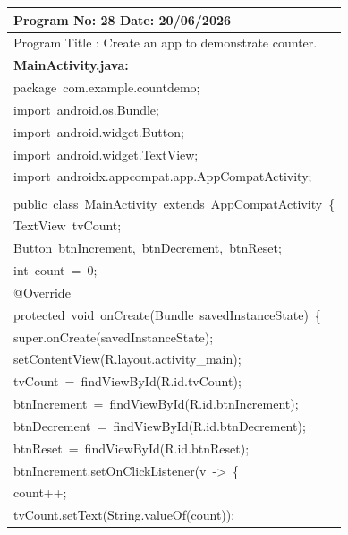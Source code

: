\documentclass[a4paper,12pt]{article}
\begin{document}
\noindent\begingroup
\renewcommand{\arraystretch}{1.1}
\begin{longtable}{|p{}|}
\hline\endfirsthead\hline\endhead\hline\endfoot\hline\endlastfoot
\rule{0pt}{13pt}Program No: 28 \hfill Date: 20/06/2026 \\
\hline
\rule{0pt}{13pt}Program Title : Create an app to demonstrate counter. \\
\hline
\rule{0pt}{13pt}\textbf{MainActivity.java:} \\
\hline
{\ttfamily\small package\ com.example.countdemo;} \\
{\ttfamily\small import\ android.os.Bundle;} \\
{\ttfamily\small import\ android.widget.Button;} \\
{\ttfamily\small import\ android.widget.TextView;} \\
{\ttfamily\small import\ androidx.appcompat.app.AppCompatActivity;} \\
\strut \\
{\ttfamily\small public\ class\ MainActivity\ extends\ AppCompatActivity\ \{} \\
{\ttfamily\small TextView\ tvCount;} \\
{\ttfamily\small Button\ btnIncrement,\ btnDecrement,\ btnReset;} \\
{\ttfamily\small int\ count\ =\ 0;} \\
{\ttfamily\small @Override} \\
{\ttfamily\small protected\ void\ onCreate(Bundle\ savedInstanceState)\ \{} \\
{\ttfamily\small super.onCreate(savedInstanceState);} \\
{\ttfamily\small setContentView(R.layout.activity\_main);} \\
{\ttfamily\small tvCount\ =\ findViewById(R.id.tvCount);} \\
{\ttfamily\small btnIncrement\ =\ findViewById(R.id.btnIncrement);} \\
{\ttfamily\small btnDecrement\ =\ findViewById(R.id.btnDecrement);} \\
{\ttfamily\small btnReset\ =\ findViewById(R.id.btnReset);} \\
{\ttfamily\small btnIncrement.setOnClickListener(v\ -\textgreater{}\ \{} \\
{\ttfamily\small count++;} \\
{\ttfamily\small tvCount.setText(String.valueOf(count));} \\

\end{longtable}
\end{document}
